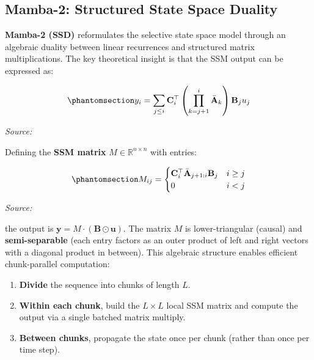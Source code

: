 \subsection{Mamba-2: Structured State Space Duality}\label{sec:mamba-2-structured-state-space-duality}

\textbf{Mamba-2 (SSD)} \cite{dao2024transformers} reformulates the selective state space model through an algebraic duality between linear recurrences and structured matrix multiplications. The key theoretical insight is that the SSM output can be expressed as:

\begin{equation}\protect\phantomsection\label{eq:mamba-ssd-output}{y_i = \sum_{j \leq i} \mathbf{C}_i^\top \left(\prod_{k=j+1}^{i} \bar{\mathbf{A}}_k\right) \mathbf{B}_j u_j
}\end{equation} \par{\small\textit{Source: \cite{dao2024transformers}}}

Defining the \textbf{SSM matrix} \(M \in \mathbb{R}^{n \times n}\) with entries:

\begin{equation}\protect\phantomsection\label{eq:mamba-ssd-matrix}{M_{ij} = \begin{cases} \mathbf{C}_i^\top \bar{\mathbf{A}}_{j+1:i} \mathbf{B}_j & i \geq j \\ 0 & i < j \end{cases}
}\end{equation} \par{\small\textit{Source: \cite{dao2024transformers}}}

the output is \(\mathbf{y} = M \cdot (\mathbf{B} \odot \mathbf{u})\). The matrix \(M\) is lower-triangular (causal) and \textbf{semi-separable} (each entry factors as an outer product of left and right vectors with a diagonal product in between). This algebraic structure enables efficient chunk-parallel computation:

\begin{enumerate}
\def\labelenumi{\arabic{enumi}.}
\tightlist
\item
  \textbf{Divide} the sequence into chunks of length \(L\).
\item
  \textbf{Within each chunk}, build the \(L \times L\) local SSM matrix and compute the output via a single batched matrix multiply.
\item
  \textbf{Between chunks}, propagate the state once per chunk (rather than once per time step).
\end{enumerate}

